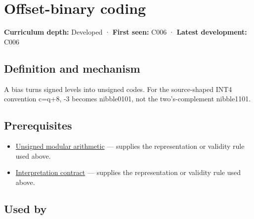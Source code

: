 \hypertarget{appendix-53a8cfb25f8d}{}\label{referencestart:appendix-53a8cfb25f8d}
\section{Offset-binary coding}\label{appendix-53a8cfb25f8d-offset-binary-coding}

\hypertarget{appendix-53a8cfb25f8d-offset-binary-coding}{}

\textbf{Curriculum depth:} Developed · \textbf{First seen:} C006 · \textbf{Latest development:} C006

\begin{allmightroledefinition}

\subsection{Definition and mechanism}\label{appendix-53a8cfb25f8d-definition-and-mechanism}

\hypertarget{appendix-53a8cfb25f8d-definition-and-mechanism}{}

A bias turns signed levels into unsigned codes. For the source-shaped INT4 convention c=q+8, -3 becomes nibble0101, not the two's-complement nibble1101.

\end{allmightroledefinition}

\subsection{Prerequisites}\label{appendix-53a8cfb25f8d-prerequisites}

\hypertarget{appendix-53a8cfb25f8d-prerequisites}{}

\begin{itemize}
\tightlist
\item
  \hyperref[appendix-c99977d88b33]{Unsigned modular arithmetic} --- supplies the representation or validity rule used above.
\item
  \hyperref[appendix-f414bd4ed05c]{Interpretation contract} --- supplies the representation or validity rule used above.
\end{itemize}

\subsection{Used by}\label{appendix-53a8cfb25f8d-used-by}

\hypertarget{appendix-53a8cfb25f8d-used-by}{}

